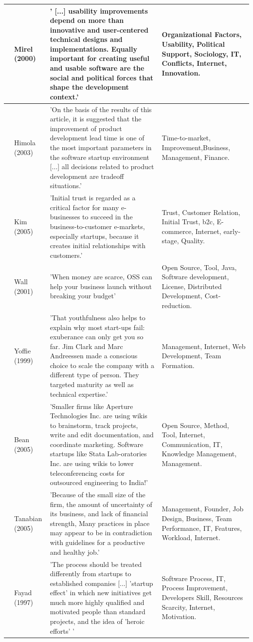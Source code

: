 \documentclass[final,5p,times,twocolumn]{elsarticle}
\begin{document}
\begin{longtable}{|p{0.2in}|p{0.8in}|p{2.5in}|p{1.4in}|}
\cite{Mirel2000} & Mirel (2000) & 
' [...] usability improvements depend on more than innovative and user-centered technical designs and implementations. Equally important for creating useful and usable software are the social and political forces that shape the development context.' & Organizational Factors, Usability, Political Support, Sociology, IT, Conflicts, Internet,  Innovation. \\ \hline 
\cite{Hilmola2003} & Himola (2003) & 'On the basis of the results of this article, it is suggested that the improvement of product development lead time is one of the most important parameters in the software startup environment [...] all decisions related to product development are tradeoff situations.' & Time-to-market, Improvement,Business, Management, Finance. \\ \hline 
\cite{Kim2005} & Kim (2005) & 'Initial trust is regarded as a critical factor for many e-businesses to succeed in the business-to-customer e-markets, especially startups, because it creates initial relationships with customers.' & Trust, Customer Relation, Initial Trust,  b2c, E-commerce, Internet, early-stage, Quality. \\ \hline 
\cite{Wall2001} & Wall (2001) & 'When money are scarce, OSS can help your business launch without breaking your budget' & Open Source, Tool, Java, Software development, License, Distributed Development, Cost-reduction. \\ \hline 
\cite{Yoffie1999} & Yoffie (1999) & 'That youthfulness also helps to explain why most start-ups fail: exuberance can only get you so far. Jim Clark and Marc Andreessen made a conscious choice to scale the company with a different type of person. They targeted maturity as well as technical expertise.' & Management, Internet, Web Development, Team Formation. \\ \hline 
\cite{Bean2005} & Bean (2005) & 'Smaller firms like Aperture Technologies Inc. are using wikis to brainstorm, track projects, write and edit documentation, and coordinate marketing. Software startups like Stata Lab-oratories Inc. are using wikis to lower teleconferencing costs for outsourced engineering to India!' & Open Source, Method, Tool, Internet,  Communication, IT, Knowledge Management, Management. \\ \hline 
\cite{Tanabian2005} & Tanabian (2005) & 'Because of the small size of the firm, the amount of uncertainty of its business, and lack of financial strength, Many practices in place may appear to be in contradiction with guidelines for a productive and healthy job.' & Management,  Founder, Job Design, Business, Team Performance, IT, Features, Workload, Internet. \\ \hline 
\cite{Fayad1997} & Fayad (1997) & 'The process should be treated differently from startups to established companies  [...] 'startup effect' in which new initiatives get much more highly qualified and motivated people than standard projects, and the idea of 'heroic efforts' ' & Software Process, IT, Process Improvement, Developers Skill, Resources Scarcity, Internet,  Motivation.  \\ \hline 


\end{longtable}
\end{document}
